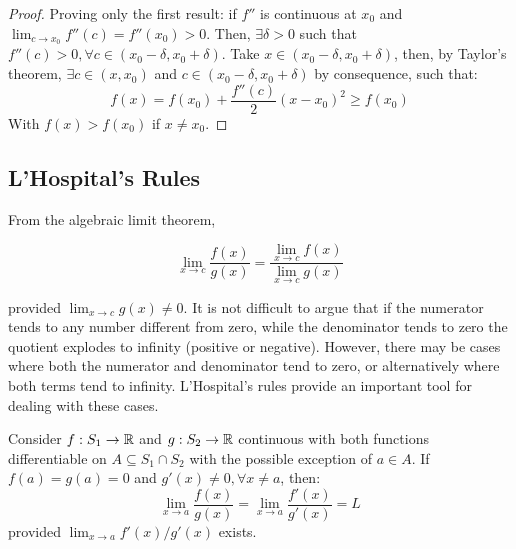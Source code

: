 \begin{proof}
    Proving only the first result: if $f''$ is continuous at $x_0$ and $\lim_{c \to x_0} f''(c) = f''(x_0) > 0$. Then, $\exists \delta > 0$ such that $f''(c) > 0, \forall c \in (x_0 - \delta, x_0 + \delta)$. Take $ x \in (x_0 - \delta, x_0 + \delta)$, then, by Taylor's theorem, $\exists c \in (x, x_0)$ and $c \in (x_0 - \delta, x_0 + \delta)$ by consequence, such that:
    \begin{equation*}
        f(x) = f(x_0) + \frac{f''(c)}{2}(x-x_0)^2 \geq f(x_0)
    \end{equation*}
    With $f(x) > f(x_0)$ if $x \neq x_0$.
\end{proof}

\subsection{L'Hospital's Rules}

From the algebraic limit theorem,

\begin{equation*}
    \lim \limits_{x \to c} \frac{f(x)}{g(x)} = \frac{\lim \limits_{x \to c} f(x)}{\lim \limits_{x \to c} g(x)}
\end{equation*}

provided $\lim_{x \to c} g(x) \neq 0$. It is not difficult to argue that if the numerator tends to any number different from zero, while the denominator tends to zero the quotient explodes to infinity (positive or negative). However, there may be cases where both the numerator and denominator tend to zero, or alternatively where both terms tend to infinity. L'Hospital's rules provide an important tool for dealing with these cases.

\begin{theorem}
    Consider $f: S_1 \to \mathbb{R}$ and $g: S_2 \to \mathbb{R}$ continuous with both functions differentiable on $A \subseteq S_1 \cap S_2$ with the possible exception of $a \in A$. If $f(a) = g(a) = 0$ and $g'(x) \neq 0, \forall x \neq a$, then:
    \begin{equation*}
        \lim \limits_{x \to a} \frac{f(x)}{g(x)} = \lim \limits_{x \to a} \frac{f'(x)}{g'(x)} =  L
    \end{equation*}
    provided $\lim_{x \to a} f'(x)/g'(x)$ exists. 
\end{theorem}

